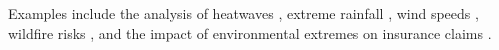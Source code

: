 \documentclass[12pt,compact]{article}
\begin{document}
Examples include the analysis of heatwaves \citep{tanarhte2015heat, french2019quantifying}, extreme rainfall \citep{osei2021estimation}, wind speeds \citep{steinkohl2013extreme, soukissian2015effect}, wildfire risks \citep{Koh2023}, and the impact of environmental extremes on insurance claims \citep{Rohrbeck_flooding_2018, Miralles2024}.

\end{document}
